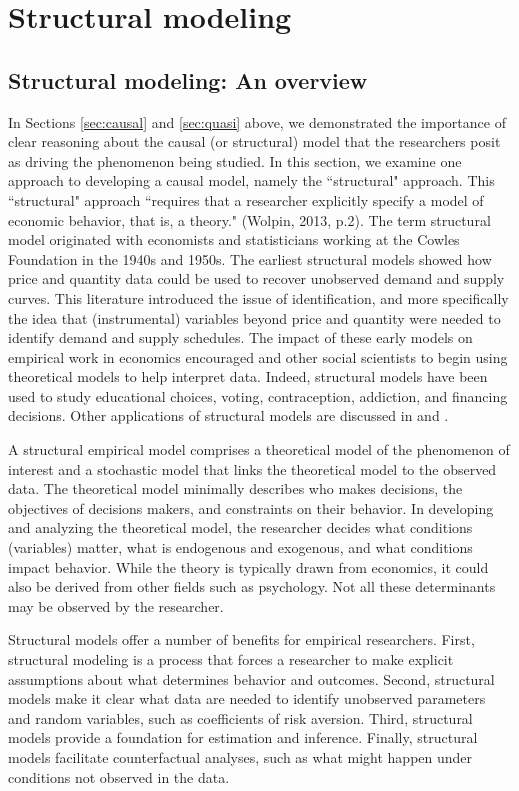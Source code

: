 \section{Structural modeling} \label{sec:struct}

\subsection{Structural modeling: An overview}
In Sections \ref{sec:causal} and \ref{sec:quasi} above, we demonstrated the importance of clear reasoning about the causal (or structural) model that the researchers posit as driving the phenomenon being studied.
In this section, we examine one approach to developing a causal model, namely the ``structural" approach.
This ``structural" approach ``requires that a researcher explicitly specify a model of economic behavior, that is, a theory." (Wolpin, 2013, p.2).
The term structural model originated with economists and statisticians working at the Cowles Foundation in the 1940s and 1950s.
The earliest structural models showed how price and quantity data could be used to recover unobserved demand and supply curves. 
This literature introduced the issue of identification, and more specifically the idea that (instrumental) variables beyond price and quantity were needed to identify demand and supply schedules. 
The impact of these early models on empirical work in economics encouraged and other social scientists to begin using theoretical models to help interpret data.
Indeed, structural models have been used to study educational choices, voting, contraception, addiction, and financing decisions. 
Other applications of structural models are discussed in \citet{Reiss:2007ej} and \citet{Reiss:2011go}.

A structural empirical model comprises a theoretical model of the phenomenon of interest and a stochastic model that links the theoretical model to the observed data.
The theoretical model minimally describes who makes decisions, the objectives of decisions makers, and constraints on their behavior.
In developing and analyzing the theoretical model, the researcher decides what conditions (variables) matter,  what is endogenous and exogenous, and what conditions impact behavior.
While the theory is typically drawn from economics, it could also be derived from other fields such as psychology.
Not all these determinants may be observed by the researcher.

Structural models offer a number of benefits for empirical researchers.
First, structural modeling is a process that forces a researcher to make explicit assumptions about what determines behavior and outcomes. 
Second, structural models make it clear what data are needed to identify unobserved parameters and random variables, such as coefficients of risk aversion.
Third, structural models provide a foundation for estimation and inference. 
Finally, structural models facilitate counterfactual analyses, such as what might happen under conditions not observed in the data. 

